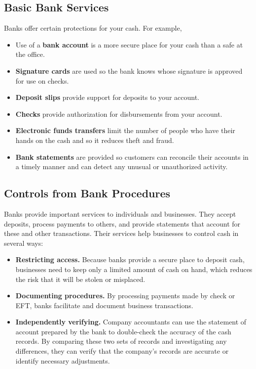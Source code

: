\documentclass[../main.tex]{subfiles}
\begin{document}
	\subsection{Basic Bank Services}
	
	Banks offer certain protections for your cash. For example,
	\begin{itemize}[noitemsep]
		\item Use of a \textbf{bank account} is a more secure place for your 
		cash than a safe at the office.
		\item \textbf{Signature cards} are used so the bank knows whose 
		signature is approved for use on checks.
		\item \textbf{Deposit slips} provide support for deposits to your 
		account.
		\item \textbf{Checks} provide authorization for disbursements from your 
		account.
		\item \textbf{Electronic funds transfers} limit the number of people 
		who have their hands on the cash and so it reduces theft and fraud.
		\item \textbf{Bank statements} are provided so customers can reconcile 
		their accounts in a timely manner and can detect any unusual or 
		unauthorized activity. 
	\end{itemize}

	\subsection{Controls from Bank Procedures}
	
	Banks provide important services to individuals and businesses. They accept 
	deposits, process payments to others, and provide statements that account 
	for these and other transactions. Their services help businesses to control 
	cash in several ways:
	\begin{itemize}[noitemsep]
		\item \textbf{Restricting access.} Because banks provide a secure place 
		to deposit cash, businesses need to keep only a limited amount of cash 
		on hand, which reduces the risk that it will be stolen or misplaced.
		\item \textbf{Documenting procedures.} By processing payments made by 
		check or EFT, banks facilitate and document business transactions.
		\item \textbf{Independently verifying.} Company accountants can use the 
		statement of account prepared by the bank to double-check the accuracy 
		of the cash records. By comparing these two sets of records and 
		investigating any differences, they can verify that the company’s 
		records are accurate or identify necessary adjustments.
	\end{itemize}
	
\end{document}

